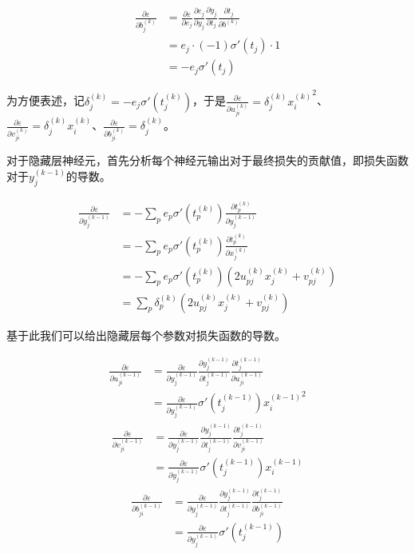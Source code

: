 \documentclass[12pt, a4paper, oneside]{ctexart}
\begin{document}
    \begin{align*}
        \frac{\partial \varepsilon}{\partial b_j^{(k)}} &= \frac{\partial \varepsilon}{\partial e_j}\frac{\partial e_j}{\partial y_j} \frac{\partial y_j}{\partial t_j} \frac{\partial t_j}{\partial b^{(k)}}\\
        &= e_j\cdot (-1) \sigma'(t_j)\cdot 1\\
        &= -e_j\sigma'(t_j)
    \end{align*}

    为方便表述，记$\delta^{(k)}_j=-e_j\sigma'\left(t_j^{(k)}\right)$，于是$\frac{\partial \varepsilon}{\partial u_{ji}^{(k)}}=\delta^{(k)}_j{x_i^{(k)}}^2$、$\frac{\partial \varepsilon}{\partial v_{ji}^{(k)}}=\delta^{(k)}_j{x_i^{(k)}}$、$\frac{\partial \varepsilon}{\partial b_{ji}^{(k)}}=\delta^{(k)}_j$。

    对于隐藏层神经元，首先分析每个神经元输出对于最终损失的贡献值，即损失函数对于$y_{j}^{(k-1)}$的导数。

    \begin{align*}
        \frac{\partial \varepsilon}{\partial y_{j}^{(k-1)}} &=-\sum_{p} e_{p}\sigma'(t_{p}^{(k)}) \frac{\partial t_p^{(k)}}{ \partial y_{j}^{(k-1)}}\\
        &=-\sum_{p} e_{p}\sigma'(t_{p}^{(k)}) \frac{\partial t_p^{(k)}}{ \partial x_{j}^{(k)}}\\
        &=-\sum_{p} e_{p}\sigma'\left(t_{p}^{(k)}\right)\left(2u^{(k)}_{pj}x_{j}^{(k)}+v^{(k)}_{pj}\right)\\
        &=\sum_{p} \delta_p^{(k)}\left(2u^{(k)}_{pj}x_{j}^{(k)}+v^{(k)}_{pj}\right)
    \end{align*}

    基于此我们可以给出隐藏层每个参数对损失函数的导数。
    
    \begin{align*}
        \frac{\partial \varepsilon}{\partial u_{ji}^{(k-1)}} &= \frac{\partial \varepsilon}{\partial y_{j}^{(k-1)}} \frac{\partial y_j^{(k-1)}}{\partial t_j^{(k-1)}} \frac{\partial t_j^{(k-1)}}{\partial u_{ji}^{(k-1)}}\\
        &= \frac{\partial \varepsilon}{\partial y_{j}^{(k-1)}} \sigma'\left(t_j^{(k-1)}\right){x_i^{(k-1)}}^2
    \end{align*}
    \begin{align*}
        \frac{\partial \varepsilon}{\partial v_{ji}^{(k-1)}} &= \frac{\partial \varepsilon}{\partial y_{j}^{(k-1)}} \frac{\partial y_j^{(k-1)}}{\partial t_j^{(k-1)}} \frac{\partial t_j^{(k-1)}}{\partial v_{ji}^{(k-1)}}\\
        &= \frac{\partial \varepsilon}{\partial y_{j}^{(k-1)}} \sigma'\left(t_j^{(k-1)}\right){x_i^{(k-1)}}
    \end{align*}
    \begin{align*}
        \frac{\partial \varepsilon}{\partial b_{ji}^{(k-1)}} &= \frac{\partial \varepsilon}{\partial y_{j}^{(k-1)}} \frac{\partial y_j^{(k-1)}}{\partial t_j^{(k-1)}} \frac{\partial t_j^{(k-1)}}{\partial b_{ji}^{(k-1)}}\\
        &= \frac{\partial \varepsilon}{\partial y_{j}^{(k-1)}} \sigma'\left(t_j^{(k-1)}\right)
    \end{align*}
\end{document}
